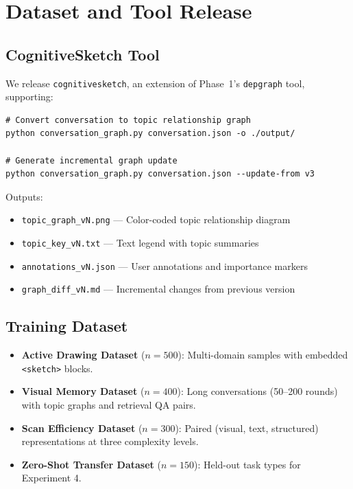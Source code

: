 \documentclass[11pt,a4paper]{article}
\begin{document}
\section{Dataset and Tool Release}

\subsection{CognitiveSketch Tool}

We release \texttt{cognitivesketch}, an extension of Phase~1's \texttt{depgraph} tool, supporting:

\begin{verbatim}
# Convert conversation to topic relationship graph
python conversation_graph.py conversation.json -o ./output/

# Generate incremental graph update
python conversation_graph.py conversation.json --update-from v3
\end{verbatim}

Outputs:
\begin{itemize}[nosep]
\item \texttt{topic\_graph\_vN.png} --- Color-coded topic relationship diagram
\item \texttt{topic\_key\_vN.txt} --- Text legend with topic summaries
\item \texttt{annotations\_vN.json} --- User annotations and importance markers
\item \texttt{graph\_diff\_vN.md} --- Incremental changes from previous version
\end{itemize}

\subsection{Training Dataset}

\begin{itemize}[nosep]
\item \textbf{Active Drawing Dataset} ($n=500$): Multi-domain samples with embedded \texttt{<sketch>} blocks.
\item \textbf{Visual Memory Dataset} ($n=400$): Long conversations (50--200 rounds) with topic graphs and retrieval QA pairs.
\item \textbf{Scan Efficiency Dataset} ($n=300$): Paired (visual, text, structured) representations at three complexity levels.
\item \textbf{Zero-Shot Transfer Dataset} ($n=150$): Held-out task types for Experiment 4.
\end{itemize}
\end{document}
